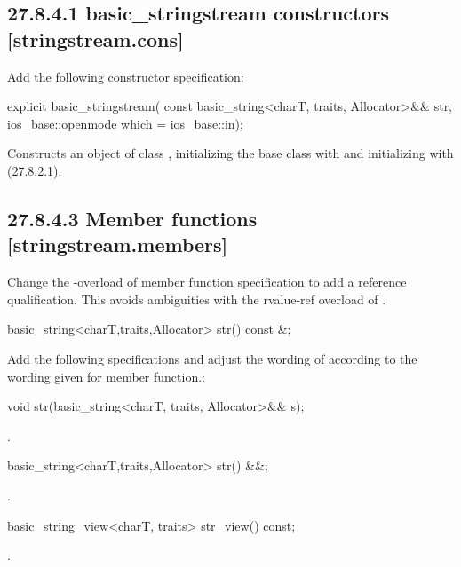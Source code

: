 \documentclass[ebook,11pt,article]{memoir}
\begin{document}
\subsection{27.8.4.1 basic\_stringstream constructors [stringstream.cons]}
Add the following constructor specification:
\begin{itemdecl}
explicit basic_stringstream(
  const basic_string<charT, traits, Allocator>&& str,
  ios_base::openmode which = ios_base::in);
\end{itemdecl}
\begin{itemdescr}
\pnum
\effects Constructs an object of class , initializing the base class with  and initializing  with  (27.8.2.1).
\end{itemdescr}
\subsection{27.8.4.3 Member functions [stringstream.members]}
Change the -overload of  member function specification to add a reference qualification. This avoids ambiguities with the rvalue-ref overload of .  
\begin{codeblock}
basic_string<charT,traits,Allocator> str() const &;
\end{codeblock}

Add the following specifications and adjust the wording of  according to the wording given for  member function.:
\begin{itemdecl}
void str(basic_string<charT, traits, Allocator>&& s);
\end{itemdecl}
\begin{itemdescr}
\pnum
\effects {}.
\end{itemdescr}
\begin{itemdecl}
basic_string<charT,traits,Allocator> str() &&;
\end{itemdecl}
\begin{itemdescr}
\pnum
\returns {}.
\end{itemdescr}
\begin{itemdecl}
basic_string_view<charT, traits> str_view() const;
\end{itemdecl}
\begin{itemdescr}
\pnum
\returns {}.
\end{itemdescr}
\end{document}
